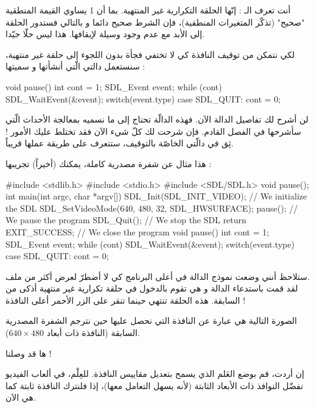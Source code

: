 أنت تعرف الـ :
إنّها الحلقة التكرارية غير المنتهية. بما أن 1 يساوي القيمة المنطقية "صحيح" (تذكّر المتغيرات المنطقية)، فإن الشرط صحيح دائما و بالتالي فستدور الحلقة إلى الأبد مع عدم وجود وسيلة لإيقافها. هذا ليس حلّا جيّدا.

لكي نتمكن من توقيف النافذة كي لا تختفي فجأة بدون اللجوء إلى حلقة غير منتهية، سنستعمل دالتي الّتي أنشأتها و سميتها
 :

\begin{Csource}
void pause()
{
	int cont = 1;
	SDL_Event event;
	while (cont)
	{
		SDL_WaitEvent(&event);
		switch(event.type)
		{
			case SDL_QUIT:
			cont = 0;
		}
	}
}
\end{Csource}

لن أشرح لك تفاصيل الدالة الآن. فهذه الدالّة تحتاج إلى ما نسميه بمعالجة الأحداث الّتي سأشرحها في الفصل القادم. فإن شرحت لك كلّ شيء الآن فقد تختلط عليك الأمور ! ثِق في دالّتي الخاصّة بالتوقيف، ستتعرف على طريقة عملها قريباً.

هذا مثال عن شفرة مصدرية كاملة، يمكنك (أخيراً) تجريبها :

\begin{Csource}
#include <stdlib.h>
#include <stdio.h>
#include <SDL/SDL.h>
void pause();
int main(int argc, char *argv[])
{
	SDL_Init(SDL_INIT_VIDEO); // We initialize the SDL
	SDL_SetVideoMode(640, 480, 32, SDL_HWSURFACE);
	pause(); // We pause the program
	SDL_Quit(); // We stop the SDL
	return EXIT_SUCCESS; // We close the program
}
void pause()
{
	int cont = 1;
	SDL_Event event;
	while (cont)
	{
		SDL_WaitEvent(&event);
		switch(event.type)
		{
			case SDL_QUIT:
			cont = 0;
		}
	}
}
\end{Csource}

ستلاحظ أنني وضعت نموذج الدالة
في أعلى البرنامج كي لا أضطرّ لعرض أكثر من ملف.\\
لقد قمت باستدعاء الدالة 
و هي تقوم بالدخول في حلقة تكرارية غير منتهية أذكى من السابقة. هذه الحلقة تنتهي حينما تنقر على الزر الأحمر 
أعلى النافذة !

الصورة التالية هي عبارة عن النافذة التي نحصل عليها حين نترجم الشفرة المصدرية السابقة (النافذة ذات أبعاد
$640 \times 480$).


ها قد وصلنا !

إن أردت، قم بوضع العَلم الذي يسمح بتعديل مقاييس النافذة. للعِلْم، في ألعاب الفيديو نفضّل النوافذ ذات الأبعاد الثابتة (لأنه يسهل التعامل معها)، إذا فلنترك النافذة ثابتة كما هي الآن.


